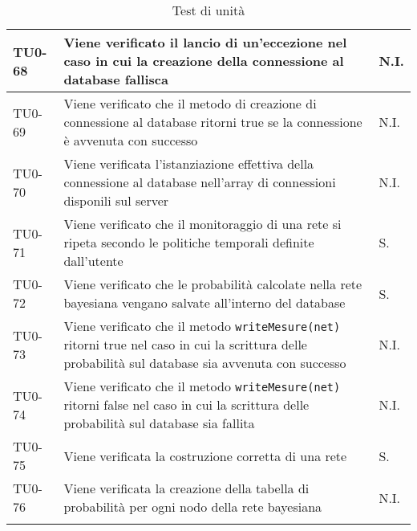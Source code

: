 \begin{longtable}{|C{.15\textwidth}|m{.65\textwidth}|C{.20\textwidth}|}
\hline
{} TU0-68 & Viene verificato il lancio di un'eccezione nel caso in cui la creazione della connessione al database fallisca & N.I. \\ 
\hline
TU0-69 & Viene verificato che il metodo di creazione di connessione al database ritorni true se la connessione è avvenuta con successo & N.I. \\ 
\hline 
{} TU0-70 & Viene verificata l'istanziazione effettiva della connessione al database nell'array di connessioni disponili sul server & N.I. \\ 
\hline 
TU0-71 & Viene verificato che il monitoraggio di una rete si ripeta secondo le politiche temporali definite dall'utente & S. \\ 
\hline 
{} TU0-72 & Viene verificato che le probabilità calcolate nella rete bayesiana vengano salvate all'interno del database  & S. \\ 
\hline 
TU0-73 & Viene verificato che il metodo \texttt{writeMesure(net)}  ritorni true nel caso in cui la scrittura delle probabilità sul database sia avvenuta con successo & N.I. \\
\hline
{}TU0-74 & Viene verificato che il metodo \texttt{writeMesure(net)} ritorni false nel caso in cui la scrittura delle probabilità sul database sia fallita & N.I. \\ 
\hline
TU0-75 & Viene verificata la costruzione corretta di una rete & S.  \\ 
\hline 
{}TU0-76 & Viene verificata la creazione della tabella di probabilità per ogni nodo della rete bayesiana & N.I. \\ 
\hline

\caption{Test di unità}
\label{testunita}
\end{longtable}




























